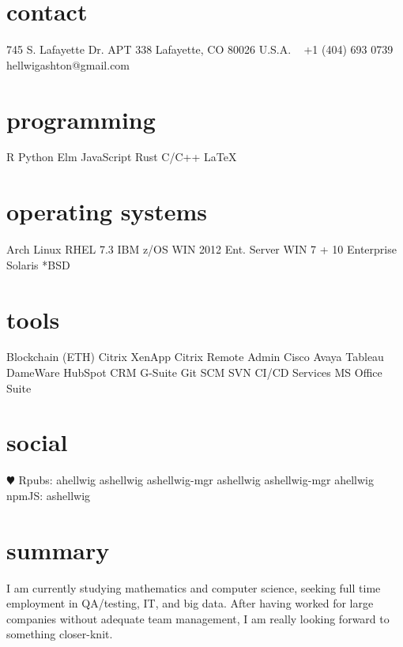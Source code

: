 \documentclass[]{cv-style}
\newcommand{\colorLinkedin}{\textcolor{rgb:red,6;green,108;blue,170}{\faLinkedin}}
\begin{document}
\lastupdated

\begin{aside}
%
\section{contact}
745 S. Lafayette Dr. APT 338
Lafayette, CO 80026
U.S.A.
~
+1 (404) 693 0739
\hspace{-5.0cm}hellwigashton@gmail.com
~
\section{programming}
R
Python
Elm
JavaScript
Rust
C/C++
\LaTeX{}
\section{operating systems}
Arch Linux
RHEL 7.3
IBM z/OS
WIN 2012 Ent. Server
WIN 7 + 10 Enterprise
Solaris
*BSD
\section{tools}
Blockchain (ETH)
Citrix XenApp
Citrix Remote Admin
Cisco
Avaya
Tableau
DameWare
HubSpot CRM
G-Suite
Git SCM
SVN
CI/CD Services
MS Office Suite
\section{social}
{\color{red} $\varheartsuit$} Rpubs: ahellwig
\faGithub\hspace{0.1ex} ashellwig
\faGithub\hspace{0.1ex} ashellwig-mgr
\faGitlab\hspace{0.1ex} ashellwig
\faGitlab\hspace{0.1ex} ashellwig-mgr
\colorLinkedin\hspace{0.1ex} ahellwig
npmJS: ashellwig
\end{aside}

\section{summary}
  \vspace{-0.2cm}
I
  am currently studying mathematics and computer science,
  seeking full time employment in QA/testing,
  IT, and big data. After having worked for large companies without adequate team management,
  I am really looking forward to something closer-knit.
\end{document}
